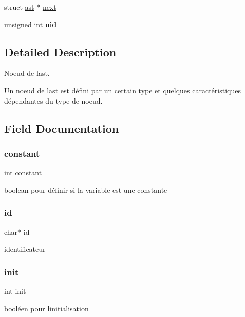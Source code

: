 \begin{DoxyCompactItemize}
\begin{tabbing}
\end{tabbing}\item 
struct \hyperlink{structast}{ast} $\ast$ \hyperlink{structast_ae48f04f7acec87ecf7f0bc953cb56bf4}{next}
\item 
\mbox{\label{structast_a0ef93dab71a01da4660664f3ce20134e}} 
unsigned int {\bfseries uid}
\end{DoxyCompactItemize}


\subsection{Detailed Description}
Noeud de l\textquotesingle{}ast. 

Un noeud de l\textquotesingle{}ast est défini par un certain type et quelques caractéristiques dépendantes du type de noeud. 

\subsection{Field Documentation}
\mbox{\label{structast_ac347bb44c6dc857729453831c5714f84}} 
\subsubsection{\texorpdfstring{constant}{constant}}
{\footnotesize\ttfamily int constant}

boolean pour définir si la variable est une constante \mbox{\label{structast_aecb3b0d045ada529257a2fbf8f829599}} 
\subsubsection{\texorpdfstring{id}{id}}
{\footnotesize\ttfamily char$\ast$ id}

identificateur \mbox{\label{structast_a795ea50921b36311ffd5e7baa2ef1f7e}} 
\subsubsection{\texorpdfstring{init}{init}}
{\footnotesize\ttfamily int init}

booléen pour l\textquotesingle{}initialisation \mbox{\label{structast_a43494a3aded0119079bec710b0466621}} 
